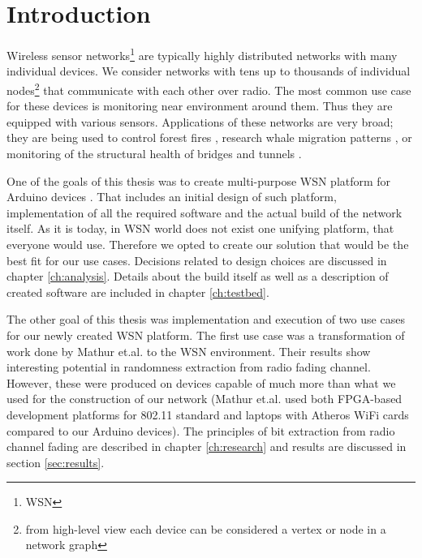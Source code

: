 \documentclass[
  print, %
  Table,   %
  nolof,     %
  nolot,     %
           oneside
]{fithesis3}
\begin{document}

\chapter{Introduction}
Wireless sensor networks\footnote{WSN} are typically highly distributed networks with many individual devices. We consider networks with tens up to thousands of individual nodes\footnote{from high-level view each device can be considered a vertex or node in a network graph} that communicate with each other over radio. The most common use case for these devices is monitoring near environment around them. Thus they are equipped with various sensors. Applications of these networks are very broad; they are being used to control forest fires \cite{li2006wireless}, research whale migration patterns \cite{haas2006new}, or monitoring of the structural health of bridges and tunnels \cite{stajano2008steel}.

One of the goals of this thesis was to create multi-purpose WSN platform for Arduino devices \cite{Arduino}. That includes an initial design of such platform, implementation of all the required software and the actual build of the network itself. As it is today, in WSN world does not exist one unifying platform, that everyone would  use. Therefore we opted to create our solution that would be the best fit for our use cases. Decisions related to design choices are discussed in chapter \ref{ch:analysis}. Details about the build itself as well as a description of created software are included in chapter \ref{ch:testbed}.

The other goal of this thesis was implementation and execution of two use cases for our newly created WSN platform. The first use case was a transformation of work done by Mathur et.al. \cite{Mathur2008Rssi} to the WSN environment. Their results show interesting potential in randomness extraction from radio fading channel. However, these were produced on devices capable of much more than what we used for the construction of our network (Mathur et.al. used both FPGA-based development platforms for 802.11 standard and laptops with Atheros WiFi cards compared to our Arduino devices). The principles of bit extraction from radio channel fading are described in chapter \ref{ch:research} and results are discussed in section \ref{sec:results}.
\end{document}

